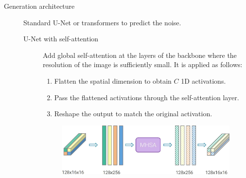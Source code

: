\begin{description}
    \item[Generation architecture]
        Standard U-Net or transformers to predict the noise.

        \begin{description}
            \item[U-Net with self-attention]
                Add global self-attention at the layers of the backbone where the resolution of the image is sufficiently small. It is applied as follows:
                \begin{enumerate}
                    \item Flatten the spatial dimension to obtain $C$ 1D activations.
                    \item Pass the flattened activations through the self-attention layer.
                    \item Reshape the output to match the original activation.
                \end{enumerate}

                \begin{figure}[H]
                    \centering
                    \includegraphics[width=0.7\linewidth]{./img/unet_attention.jpg}
                \end{figure}
        \end{description}
\end{description}


